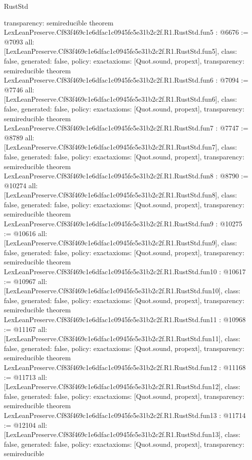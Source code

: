 \begin{lexlean}{RustStd}
\begin{coremodule}
{  transparency: semireducible
}
theorem LexLeanPreserve.Cf83f469c1e6dfac1c0945fe5e31b2c2f.R1.RustStd.fun5 : @6676 := @7093 {
  all: [LexLeanPreserve.Cf83f469c1e6dfac1c0945fe5e31b2c2f.R1.RustStd.fun5],
  class: false,
  generated: false,
  policy: exact{axioms: [Quot.sound, propext]},
  transparency: semireducible
}
theorem LexLeanPreserve.Cf83f469c1e6dfac1c0945fe5e31b2c2f.R1.RustStd.fun6 : @7094 := @7746 {
  all: [LexLeanPreserve.Cf83f469c1e6dfac1c0945fe5e31b2c2f.R1.RustStd.fun6],
  class: false,
  generated: false,
  policy: exact{axioms: [Quot.sound, propext]},
  transparency: semireducible
}
theorem LexLeanPreserve.Cf83f469c1e6dfac1c0945fe5e31b2c2f.R1.RustStd.fun7 : @7747 := @8789 {
  all: [LexLeanPreserve.Cf83f469c1e6dfac1c0945fe5e31b2c2f.R1.RustStd.fun7],
  class: false,
  generated: false,
  policy: exact{axioms: [Quot.sound, propext]},
  transparency: semireducible
}
theorem LexLeanPreserve.Cf83f469c1e6dfac1c0945fe5e31b2c2f.R1.RustStd.fun8 : @8790 := @10274 {
  all: [LexLeanPreserve.Cf83f469c1e6dfac1c0945fe5e31b2c2f.R1.RustStd.fun8],
  class: false,
  generated: false,
  policy: exact{axioms: [Quot.sound, propext]},
  transparency: semireducible
}
theorem LexLeanPreserve.Cf83f469c1e6dfac1c0945fe5e31b2c2f.R1.RustStd.fun9 : @10275 := @10616 {
  all: [LexLeanPreserve.Cf83f469c1e6dfac1c0945fe5e31b2c2f.R1.RustStd.fun9],
  class: false,
  generated: false,
  policy: exact{axioms: [Quot.sound, propext]},
  transparency: semireducible
}
theorem LexLeanPreserve.Cf83f469c1e6dfac1c0945fe5e31b2c2f.R1.RustStd.fun10 : @10617 := @10967 {
  all: [LexLeanPreserve.Cf83f469c1e6dfac1c0945fe5e31b2c2f.R1.RustStd.fun10],
  class: false,
  generated: false,
  policy: exact{axioms: [Quot.sound, propext]},
  transparency: semireducible
}
theorem LexLeanPreserve.Cf83f469c1e6dfac1c0945fe5e31b2c2f.R1.RustStd.fun11 : @10968 := @11167 {
  all: [LexLeanPreserve.Cf83f469c1e6dfac1c0945fe5e31b2c2f.R1.RustStd.fun11],
  class: false,
  generated: false,
  policy: exact{axioms: [Quot.sound, propext]},
  transparency: semireducible
}
theorem LexLeanPreserve.Cf83f469c1e6dfac1c0945fe5e31b2c2f.R1.RustStd.fun12 : @11168 := @11713 {
  all: [LexLeanPreserve.Cf83f469c1e6dfac1c0945fe5e31b2c2f.R1.RustStd.fun12],
  class: false,
  generated: false,
  policy: exact{axioms: [Quot.sound, propext]},
  transparency: semireducible
}
theorem LexLeanPreserve.Cf83f469c1e6dfac1c0945fe5e31b2c2f.R1.RustStd.fun13 : @11714 := @12104 {
  all: [LexLeanPreserve.Cf83f469c1e6dfac1c0945fe5e31b2c2f.R1.RustStd.fun13],
  class: false,
  generated: false,
  policy: exact{axioms: [Quot.sound, propext]},
  transparency: semireducible
}
\end{coremodule}
\end{lexlean}
